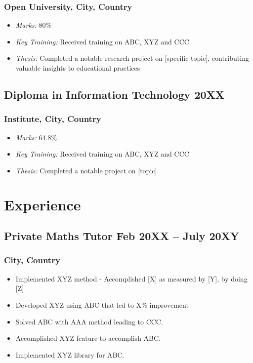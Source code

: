 \documentclass[11pt]{article}
\begin{document}
    \subsubsection{Open University,  City, Country }
    \begin{itemize}
        \item[\checkmark] \textit{Marks:} 80\% %
        \item[\checkmark] \textit{Key Training:} Received training on ABC, XYZ and CCC
        \item[\checkmark] \textit{Thesis:} Completed a notable research project on [specific topic], contributing valuable insights to educational practices
    \end{itemize}
    
    \subsection{Diploma in Information Technology \hfill \normalfont 20XX}
    \subsubsection{Institute,  City, Country }
    \begin{itemize}
        \item[\checkmark] \textit{Marks:} 64.8\% %
        \item[\checkmark] \textit{Key Training:} Received training on ABC, XYZ and CCC
        \item[\checkmark] \textit{Thesis:} Completed a notable project on [topic].
    \end{itemize}
    \section{Experience}
    \subsection{Private Maths Tutor \hfill \normalfont Feb 20XX -- July 20XY}
    \subsubsection{City, Country}
    \begin{itemize}
        \item[\checkmark] Implemented XYZ method - Accomplished [X] as measured by [Y], by doing [Z] 
        \item[\checkmark]  Developed XYZ using ABC that led to X\% improvement 
        \item[\checkmark] Solved ABC with AAA method leading to CCC.
        \item[\checkmark]  Accomplished XYZ feature to accomplish ABC.
        \item[\checkmark]  Implemented XYZ library for ABC.
    \end{itemize}
    
\end{document}
